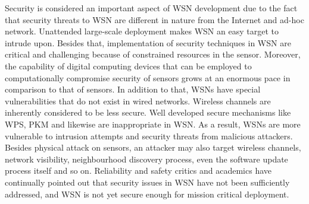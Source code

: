 \documentclass[conference,final]{IEEEtran}
\begin{document}
Security is considered an important aspect of WSN development due to the fact that  security threats to WSN are different in nature from the Internet and ad-hoc network.
Unattended large-scale deployment makes WSN an easy target to intrude upon.
Besides that, implementation of security techniques in WSN are critical and challenging because of constrained resources in the sensor.
Moreover, the capability of digital computing devices that can be employed to computationally compromise security of sensors grows at an enormous pace in comparison to that of sensors.
In addition to that, WSNs have special vulnerabilities that do not exist in wired networks.
Wireless channels are inherently considered to be less secure.
Well developed secure mechanisms like WPS, PKM and likewise are inappropriate in WSN. %
As a result, WSNs are more vulnerable to intrusion attempts and security threats from malicious attackers.
Besides physical attack on sensors, an attacker may also target wireless channels, network visibility, neighbourhood discovery process, even the software update process itself and so on.
Reliability and safety critics and academics have continually pointed out that security issues in WSN have not been sufficiently addressed, and WSN is not yet secure enough for mission critical deployment.

\end{document}
